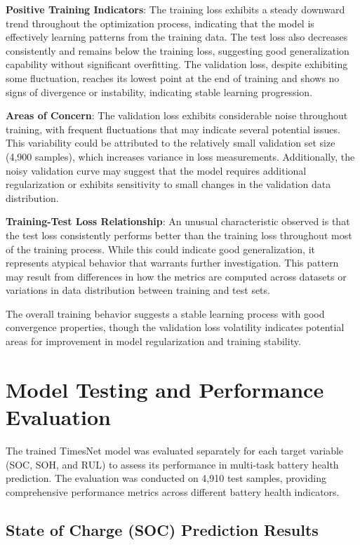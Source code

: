 \textbf{Positive Training Indicators}: The training loss exhibits a steady downward trend throughout the optimization process, indicating that the model is effectively learning patterns from the training data. The test loss also decreases consistently and remains below the training loss, suggesting good generalization capability without significant overfitting. The validation loss, despite exhibiting some fluctuation, reaches its lowest point at the end of training and shows no signs of divergence or instability, indicating stable learning progression.

\textbf{Areas of Concern}: The validation loss exhibits considerable noise throughout training, with frequent fluctuations that may indicate several potential issues. This variability could be attributed to the relatively small validation set size (4,900 samples), which increases variance in loss measurements. Additionally, the noisy validation curve may suggest that the model requires additional regularization or exhibits sensitivity to small changes in the validation data distribution.

\textbf{Training-Test Loss Relationship}: An unusual characteristic observed is that the test loss consistently performs better than the training loss throughout most of the training process. While this could indicate good generalization, it represents atypical behavior that warrants further investigation. This pattern may result from differences in how the metrics are computed across datasets or variations in data distribution between training and test sets.

The overall training behavior suggests a stable learning process with good convergence properties, though the validation loss volatility indicates potential areas for improvement in model regularization and training stability.

\section{Model Testing and Performance Evaluation}
\label{sec:model_testing}

The trained TimesNet model was evaluated separately for each target variable (SOC, SOH, and RUL) to assess its performance in multi-task battery health prediction. The evaluation was conducted on 4,910 test samples, providing comprehensive performance metrics across different battery health indicators.

\subsection{State of Charge (SOC) Prediction Results}
\label{subsec:soc_results}

